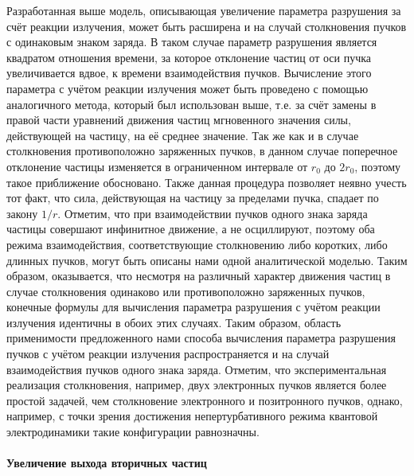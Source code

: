 Разработанная выше модель, описывающая увеличение параметра разрушения за счёт реакции излучения, может быть расширена и на случай столкновения пучков с одинаковым знаком заряда.
В таком случае параметр разрушения является квадратом отношения времени, за которое отклонение частиц от оси пучка увеличивается вдвое, к времени взаимодействия пучков.
Вычисление этого параметра с учётом реакции излучения может быть проведено с помощью аналогичного метода, который был использован выше, т.е. за счёт замены в правой части уравнений движения частиц мгновенного значения силы, действующей на частицу, на её среднее значение.
Так же как и в случае столкновения противоположно заряженных пучков, в данном случае поперечное отклонение частицы изменяется в ограниченном интервале от $r_0$ до $2r_0$, поэтому такое приближение обосновано.
Также данная процедура позволяет неявно учесть тот факт, что сила, действующая на частицу за пределами пучка, спадает по закону $1/r$.
Отметим, что при взаимодействии пучков одного знака заряда частицы совершают инфинитное движение, а не осциллируют, поэтому оба режима взаимодействия, соответствующие столкновению либо коротких, либо длинных пучков, могут быть описаны нами одной аналитической моделью.
Таким образом, оказывается, что несмотря на различный характер движения частиц в случае столкновения одинаково или противоположно заряженных пучков, конечные формулы для вычисления параметра разрушения с учётом реакции излучения идентичны в обоих этих случаях.
Таким образом, область применимости предложенного нами способа вычисления параметра разрушения пучков с учётом реакции излучения распространяется и на случай взаимодействия пучков одного знака заряда. Отметим, что экспериментальная реализация столкновения, например, двух электронных пучков является более простой задачей, чем столкновение электронного и позитронного пучков, однако, например, с точки зрения достижения непертурбативного режима квантовой электродинамики такие конфигурации равнозначны.


\paragraph{Увеличение выхода вторичных частиц}

